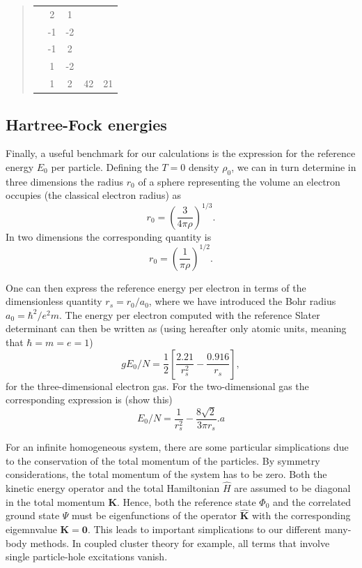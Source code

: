 \documentclass[%
oneside,                 %
final,                   %
10pt]{article}
\begin{document}
\begin{quote}
\begin{tabular}{ccccc}
                      & 2       & 1       &                            &                          \\
                      & -1      & -2      &                            &                          \\
                      & -1      & 2       &                            &                          \\
                      & 1       & -2      &                            &                          \\
                      & 1       & 2       & 42                         & 21                       \\
\hline
\end{tabular}
\end{quote}

\noindent
\subsection{Hartree-Fock energies}

Finally, a useful benchmark for our calculations is the expression for
the reference energy $E_0$ per particle.
Defining the $T=0$ density $\rho_0$, we can in turn determine in three
dimensions the radius $r_0$ of a sphere representing the volume an
electron occupies (the classical electron radius) as
\[
r_0= \left(\frac{3}{4\pi \rho}\right)^{1/3}.
\]
In two dimensions the corresponding quantity is
\[
r_0= \left(\frac{1}{\pi \rho}\right)^{1/2}.
\]


One can then express the reference energy per electron in terms of the
dimensionless quantity $r_s=r_0/a_0$, where we have introduced the
Bohr radius $a_0=\hbar^2/e^2m$. The energy per electron computed with
the reference Slater determinant can then be written as
(using hereafter only atomic units, meaning that $\hbar = m = e = 1$)
\[g
E_0/N=\frac{1}{2}\left[\frac{2.21}{r_s^2}-\frac{0.916}{r_s}\right],
\]
for the three-dimensional electron gas.  For the two-dimensional gas
the corresponding expression is (show this)
\[
E_0/N=\frac{1}{r_s^2}-\frac{8\sqrt{2}}{3\pi r_s}.a
\]


For an infinite homogeneous system, there are some particular
simplications due to the conservation of the total momentum of the
particles.  By symmetry considerations, the total momentum of the
system has to be zero. Both the kinetic energy operator and the
total Hamiltonian $\hat{H}$ are assumed to be diagonal in the total
momentum $\mathbf{K}$. Hence, both the reference state $\Phi_{0}$ and
the correlated ground state $\Psi$ must be eigenfunctions of the
operator $\mathbf{\hat{K}}$ with the corresponding eigemnvalue
$\mathbf{K} = \mathbf{0}$.  This leads to important
simplications to our different many-body methods. In coupled cluster
theory for example, all
terms that involve single particle-hole excitations vanish. 
\end{document}
